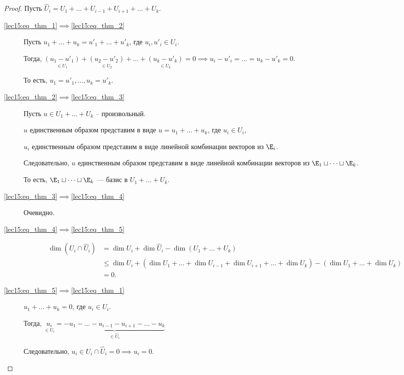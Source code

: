 \begin{proof}
    Пусть $\widehat{U}_i = U_1 + \dots + U_{i - 1} + U_{i + 1} + \dots + U_k$.

    \begin{description}
    \item[\ref{lec15:eq_thm_1}$\implies$\ref{lec15:eq_thm_2}]
        Пусть $u_1 + \dots + u_k = u'_1 + \dots + u'_k$, где $u_i, u'_i \in U_i$.

        Тогда, $\underset{\in U_1}{(u_1 - u'_1)} + \underset{\in U_2}{(u_2 - u'_2)} + \dots + \underset{\in U_k}{(u_k - u'_k)} = 0 \implies u_i - u'_i = \dots = u_k - u'_k = 0$.

        То есть, $u_1 = u'_1, \dots, u_k = u'_k$.

    \item[\ref{lec15:eq_thm_2}$\implies$\ref{lec15:eq_thm_3}]
        Пусть $u \in U_1 + \dots + U_k$ -- произвольный.

        $u$ единственным образом представим в виде $u = u_1 + \dots + u_k$, где $u_i \in U_i$,

        $u_i$ единственным образом представим в виде линейной комбинации векторов из $\E_i$.
 
        Следовательно, $u$ единственным образом представим в виде линейной комбинации векторов из $\E_1 \sqcup \dots \sqcup \E_k$.

        То есть, $\E_1 \sqcup \dots \sqcup \E_k$ --- базис в $U_1 + \dots + U_k$.

    \item[\ref{lec15:eq_thm_3}$\implies$\ref{lec15:eq_thm_4}]
        Очевидно. 

    \item[\ref{lec15:eq_thm_4}$\implies$\ref{lec15:eq_thm_5}]
        \begin{align*}
            \dim (U_i \cap \widehat{U}_i) 
            &= \dim U_i + \dim \widehat{U}_i - \dim (U_1 + \dots + U_k) \\
            &\leq \dim U_i + (\dim U_1 + \dots + \dim U_{i - 1} + \dim U_{i + 1} + \dots + \dim U_k) - (\dim U_1 + \dots + \dim U_k) \\
            &= 0
        .\end{align*}

    \item[\ref{lec15:eq_thm_5}$\implies$\ref{lec15:eq_thm_1}]
        $u_1 + \dots + u_k = 0$, где $u_i \in U_i$.

        Тогда, $\underset{\in U_i}{u_i} = \underbrace{-u_1 - \dots - u_{i - 1} - u_{i + 1} - \dots - u_k}_{\in \widehat{U}_i}$

        Следовательно, $u_i \in U_i \cap \widehat{U}_i = 0 \implies u_i = 0$.
        \qedhere
    \end{description}
\end{proof}

